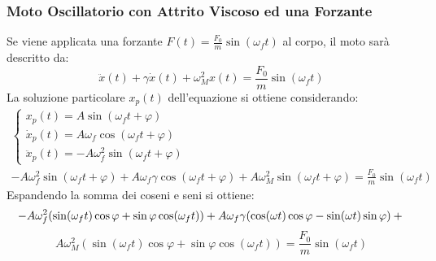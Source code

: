 \documentclass{article}
\numberwithin{equation}{subsection}
\begin{document}
\subsubsection{Moto Oscillatorio con Attrito Viscoso ed una Forzante}
Se viene applicata una forzante $F(t)=\displaystyle\frac{F_0}{m}\sin(\omega_f t)$ 
al corpo, il moto sarà descritto da: 
\begin{equation}
    \ddot x(t)+\gamma\dot x(t)+\omega_M^{2}x(t)=\displaystyle\frac{F_0}{m}\sin(\omega_f t)
\end{equation}
La soluzione particolare $x_p(t)$ dell'equazione si ottiene considerando:
\begin{gather*}
    \begin{cases}
        x_p(t)=A\sin(\omega_f t+\varphi)\\
        \dot x_p(t)=A\omega_f\cos(\omega_f t+\varphi)\\
        \ddot x_p(t)=-A\omega_f^{2}\sin(\omega_f t+\varphi)
    \end{cases}\\
    -A\omega_f^{2}\sin(\omega_f t+\varphi)+
    A\omega_f\gamma \cos(\omega_f t+\varphi)+
    A\omega_M^{2}\sin(\omega_f t+\varphi)=\displaystyle\frac{F_0}{m}\sin(\omega_f t)
\end{gather*}
Espandendo la somma dei coseni e seni si ottiene: 
\begin{equation*}
    -A\omega_f^{2}(\sin(\omega_f t)\cos\varphi+\sin\varphi \cos(\omega_f t))+
    A\omega_f\gamma(\cos(\omega t)\cos\varphi-\sin(\omega t)\sin\varphi)+\\
\end{equation*}
\begin{equation*}
    A\omega_M^{2}(\sin(\omega_f t)\cos\varphi+\sin\varphi \cos(\omega_f t))=\displaystyle\frac{F_0}{m}\sin(\omega_f t)
\end{equation*}
\end{document}
